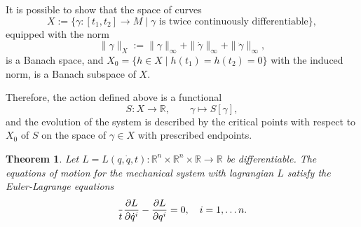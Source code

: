 \documentclass[english,fontsize=11pt,paper=a5,oneside]{scrbook}
\newcommand{\R}{\mathbb{R}}
\let\d\relax
\newcommand{\d}{\mathrm{d}}
\newtheorem{theorem}{Theorem}[chapter]
\theoremstyle{definition}
\begin{document}
It is possible to show that the space of curves
\begin{equation}
  X := \big\{ \gamma: [t_1, t_2] \to M \mid \gamma \mbox{ is twice continuously differentiable}\big\},
\end{equation} equipped with the norm
\begin{equation}
  \|\gamma\|_X :=
  \|\gamma\|_\infty + \|\dot \gamma\|_\infty + \|\ddot \gamma\|_\infty,
\end{equation}
is a Banach space, and $X_0 = \big\{h\in X \mid h(t_1) = h(t_2) = 0\big\}$ with the induced norm, is a Banach subspace of $X$.

Therefore, the action defined above is a functional
\begin{equation}
  S : X \to \R,\qquad \gamma \mapsto S[\gamma],
\end{equation}
and the evolution of the system is described by the critical points with respect to $X_0$ of $S$ on the space of $\gamma \in X$ with prescribed endpoints.

\begin{theorem}
  Let $L = L(q, \dot q, t) : \R^{n}\times \R^{n}\times \R \to \R$ be differentiable.
  The equations of motion for the mechanical system with lagrangian $L$ satisfy the \emph{Euler-Lagrange equations}
  \begin{equation}\label{eq:eulerlagrange}
    \frac{\d}{\d t}\frac{\partial L}{\partial \dot q^i} - \frac{\partial L}{\partial q^i} = 0, \quad i=1,\ldots n.
  \end{equation}
\end{theorem}
\end{document}
